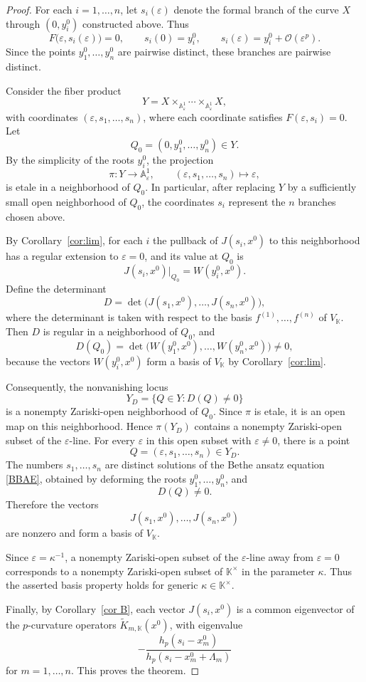 \documentclass[12pt]{amsart}
\theoremstyle{definition} %
\numberwithin{equation}{section}
\theoremstyle{definition}
\let\mc\mathcal
\let\eps\varepsilon
\let\ka\kappa
\let\La\Lambda
\def\K{{\mathbb K}}
\begin{document}
\begin{proof}
For each $i=1,\dots,n$, let $s_i(\eps)$ denote the formal branch of the
curve $X$ through $(0,y_i^0)$ constructed above. Thus
\[
F\bigl(\eps,s_i(\eps)\bigr)=0,
\qquad
s_i(0)=y_i^0,
\qquad
s_i(\eps)=y_i^0+\mc O(\eps^p).
\]
Since the points $y_1^0,\dots,y_n^0$ are pairwise distinct, these branches
are pairwise distinct.

Consider the fiber product
\[
Y=X\times_{\mathbb A^1_{\eps}}\cdots
\times_{\mathbb A^1_{\eps}}X,
\]
with coordinates $(\eps,s_1,\dots,s_n)$, where each coordinate satisfies
$F(\eps,s_i)=0$. Let
\[
Q_0=(0,y_1^0,\dots,y_n^0)\in Y.
\]
By the simplicity of the roots $y_i^0$, the projection
\[
\pi:Y\longrightarrow \mathbb A^1_{\eps},
\qquad
(\eps,s_1,\dots,s_n)\longmapsto\eps,
\]
is etale in a neighborhood of $Q_0$. In particular, after replacing $Y$
by a sufficiently small open neighborhood of $Q_0$, the coordinates $s_i$
represent the $n$ branches chosen above.

By Corollary~\ref{cor:lim}, for each $i$ the pullback of
$J(s_i,x^0)$ to this neighborhood has a regular extension to $\eps=0$,
and its value at $Q_0$ is
\[
J(s_i,x^0)\big|_{Q_0}=W(y_i^0,x^0).
\]
Define the determinant
\[
D
=
\det\bigl(J(s_1,x^0),\dots,J(s_n,x^0)\bigr),
\]
where the determinant is taken with respect to the basis
$f^{(1)},\dots,f^{(n)}$ of $V_\K$. Then $D$ is regular in a neighborhood of
$Q_0$, and
\[
D(Q_0)
=
\det\bigl(W(y_1^0,x^0),\dots,W(y_n^0,x^0)\bigr)\neq0,
\]
because the vectors $W(y_i^0,x^0)$ form a basis of $V_\K$ by
Corollary~\ref{cor:lim}.

Consequently, the nonvanishing locus
\[
Y_D=\{Q\in Y:D(Q)\neq0\}
\]
is a nonempty Zariski-open neighborhood of $Q_0$. Since $\pi$ is etale,
it is an open map on this neighborhood. Hence $\pi(Y_D)$ contains a
nonempty Zariski-open subset of the $\eps$-line. For every $\eps$ in this
open subset with $\eps\neq0$, there is a point
\[
Q=(\eps,s_1,\dots,s_n)\in Y_D.
\]
The numbers $s_1,\dots,s_n$ are distinct solutions of the Bethe ansatz
equation \eqref{BBAE}, obtained by deforming the roots
$y_1^0,\dots,y_n^0$, and
\[
D(Q)\neq0.
\]
Therefore the vectors
\[
J(s_1,x^0),\dots,J(s_n,x^0)
\]
are nonzero and form a basis of $V_\K$.

Since $\eps=\ka^{-1}$, a nonempty Zariski-open subset of the
$\eps$-line away from $\eps=0$ corresponds to a nonempty Zariski-open
subset of $\K^\times$ in the parameter $\ka$. Thus the asserted basis
property holds for generic $\ka\in\K^\times$.

Finally, by Corollary~\ref{cor B}, each vector $J(s_i,x^0)$ is a common
eigenvector of the $p$-curvature operators
$\tilde K_{m,\K}(x^0)$, with eigenvalue
\[
-\frac{h_p(s_i-x_m^0)}
       {h_p(s_i-x_m^0+\La_m)}
\]
for $m=1,\dots,n$. This proves the theorem.
\end{proof}
\end{document}
